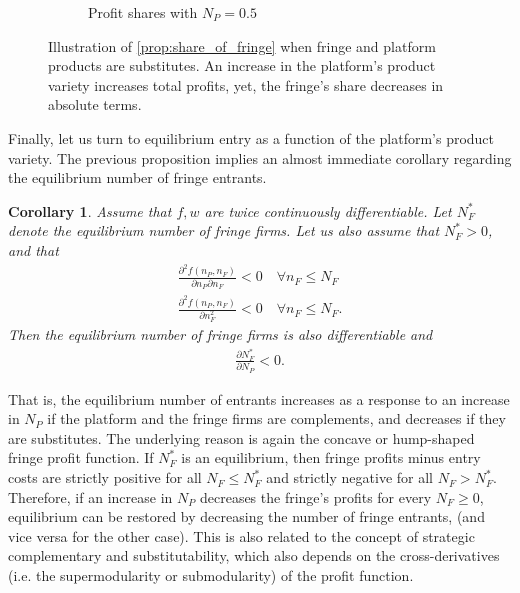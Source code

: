 \documentclass[a4paper]{article}
\newtheorem{corollary}{Corollary}
\begin{document}
\begin{figure}[ht]
\begin{subfigure}[b]{0.45\textwidth}
        \caption{Profit shares with $N_P = 0.5$}
    \end{subfigure}
    \caption{Illustration of \cref{prop:share_of_fringe} when fringe and platform products are substitutes. An increase in the platform's product variety increases total profits, yet, the fringe's share decreases in absolute terms.}
    \label{fig:increase_N_P_fringe}
\end{figure}

Finally, let us turn to equilibrium entry as a function of the platform's product variety.
The previous proposition implies an almost immediate corollary regarding the equilibrium number of fringe entrants.
\begin{corollary}
    \label{cor:fringe_entry}
    Assume that $f, w$ are twice continuously differentiable.
    Let $N_F^*$ denote the equilibrium number of fringe firms.
    Let us also assume that $N_F^* > 0$, and that
    \begin{align*}
        \frac{\partial^2 f(n_P, n_F)}{\partial n_P \partial n_F} < 0 \quad \forall n_F \leq N_F \\
        \frac{\partial^2 f(n_P, n_F)}{\partial n_F^2} < 0 \quad \forall n_F \leq N_F.
    \end{align*}
    Then the equilibrium number of fringe firms is also differentiable and
    \begin{align*}
        \frac{\partial N_F^*}{\partial N_P} < 0.
    \end{align*}
\end{corollary}
That is, the equilibrium number of entrants increases as a response to an increase in $N_P$ if the platform and the fringe firms are complements, and decreases if they are substitutes.
The underlying reason is again the concave or hump-shaped fringe profit function.
If $N_F^*$ is an equilibrium, then fringe profits minus entry costs are strictly positive for all $N_F \leq N_F^*$ and strictly negative for all $N_F > N_F^*$.
Therefore, if an increase in $N_P$ decreases the fringe's profits for every $N_F \geq 0$, equilibrium can be restored by decreasing the number of fringe entrants, (and vice versa for the other case).
This is also related to the concept of strategic complementary and substitutability, which also depends on the cross-derivatives (i.e. the supermodularity or submodularity) of the profit function.
\end{document}
